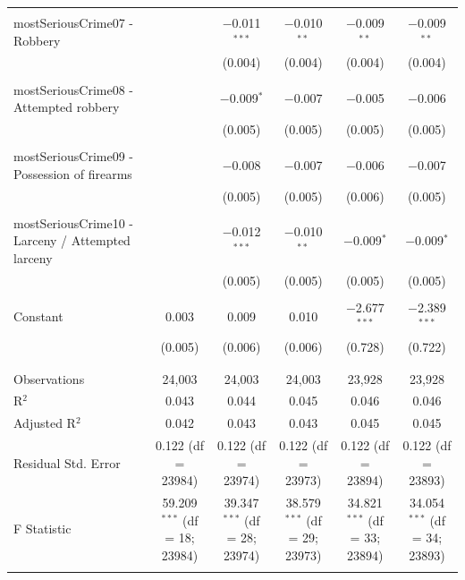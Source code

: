 \documentclass[a4paper,12pt]{article}
\begin{document}
\begin{table}[!htbp]
{\begin{tabular}{@{\extracolsep{5pt}}lccccc}
  & & & & & \\ 
 mostSeriousCrime07 - Robbery &  & $-$0.011$^{***}$ & $-$0.010$^{**}$ & $-$0.009$^{**}$ & $-$0.009$^{**}$ \\ 
  &  & (0.004) & (0.004) & (0.004) & (0.004) \\ 
  & & & & & \\ 
 mostSeriousCrime08 - Attempted robbery &  & $-$0.009$^{*}$ & $-$0.007 & $-$0.005 & $-$0.006 \\ 
  &  & (0.005) & (0.005) & (0.005) & (0.005) \\ 
  & & & & & \\ 
 mostSeriousCrime09 - Possession of firearms &  & $-$0.008 & $-$0.007 & $-$0.006 & $-$0.007 \\ 
  &  & (0.005) & (0.005) & (0.006) & (0.005) \\ 
  & & & & & \\ 
 mostSeriousCrime10 - Larceny / Attempted larceny &  & $-$0.012$^{***}$ & $-$0.010$^{**}$ & $-$0.009$^{*}$ & $-$0.009$^{*}$ \\ 
  &  & (0.005) & (0.005) & (0.005) & (0.005) \\ 
  & & & & & \\ 
  
 Constant & 0.003 & 0.009 & 0.010 & $-$2.677$^{***}$ & $-$2.389$^{***}$ \\ 
  & (0.005) & (0.006) & (0.006) & (0.728) & (0.722) \\ 
  & & & & & \\ 
\hline \\[-1.8ex] 
Observations & 24,003 & 24,003 & 24,003 & 23,928 & 23,928 \\ 
R$^{2}$ & 0.043 & 0.044 & 0.045 & 0.046 & 0.046 \\ 
Adjusted R$^{2}$ & 0.042 & 0.043 & 0.043 & 0.045 & 0.045 \\ 
Residual Std. Error & 0.122 (df = 23984) & 0.122 (df = 23974) & 0.122 (df = 23973) & 0.122 (df = 23894) & 0.122 (df = 23893) \\ 
F Statistic & 59.209$^{***}$ (df = 18; 23984) & 39.347$^{***}$ (df = 28; 23974) & 38.579$^{***}$ (df = 29; 23973) & 34.821$^{***}$ (df = 33; 23894) & 34.054$^{***}$ (df = 34; 23893) \\ 
\endrule
\hline 
\hline \\[-1.8ex] 
\end{tabular} }
\end{table} 
\end{document}
